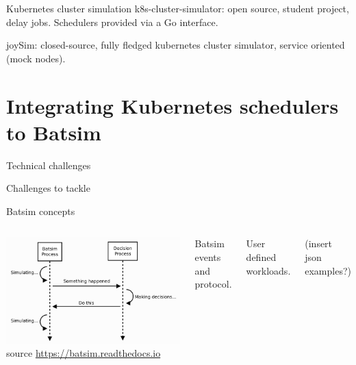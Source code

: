 \documentclass[12pt, aspectratio=43]{beamer}
\begin{document}
%
%

\begin{frame}{Kubernetes cluster simulation}
	k8s-cluster-simulator: open source, student project, delay jobs.
	Schedulers provided via a Go interface.

	joySim: closed-source, fully fledged kubernetes cluster simulator,
	service oriented (mock nodes).
\end{frame}

\section{Integrating Kubernetes schedulers to Batsim}

\begin{frame}{Technical challenges}
	\begin{alertblock}{Challenges to tackle}
		\begin{enumerate}
		\end{enumerate}
	\end{alertblock}
\end{frame}

\begin{frame}{Batsim concepts}
	\begin{columns}
		\centering
		\includegraphics[width=\textwidth]{../imgs/batsim-sequence-diag.png}
		\tiny{source \url{https://batsim.readthedocs.io}}

		Batsim events and protocol.

		User defined workloads.

		(insert json examples?)
\end{columns}
\end{frame}
\end{document}
